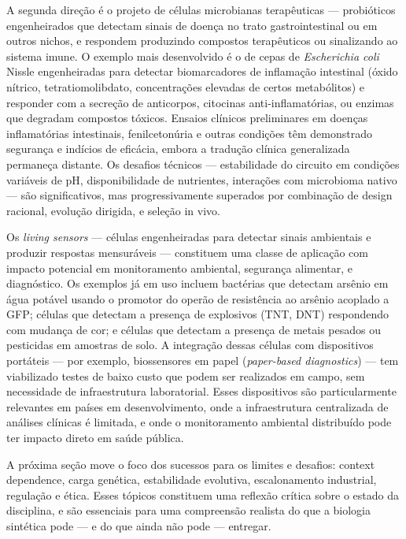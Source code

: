 A segunda direção é o projeto de células microbianas terapêuticas --- probióticos engenheirados que detectam sinais de doença no trato gastrointestinal ou em outros nichos, e respondem produzindo compostos terapêuticos ou sinalizando ao sistema imune. O exemplo mais desenvolvido é o de cepas de \textit{Escherichia coli} Nissle engenheiradas para detectar biomarcadores de inflamação intestinal (óxido nítrico, tetratiomolibdato, concentrações elevadas de certos metabólitos) e responder com a secreção de anticorpos, citocinas anti-inflamatórias, ou enzimas que degradam compostos tóxicos. Ensaios clínicos preliminares em doenças inflamatórias intestinais, fenilcetonúria e outras condições têm demonstrado segurança e indícios de eficácia, embora a tradução clínica generalizada permaneça distante. Os desafios técnicos --- estabilidade do circuito em condições variáveis de pH, disponibilidade de nutrientes, interações com microbioma nativo --- são significativos, mas progressivamente superados por combinação de design racional, evolução dirigida, e seleção in vivo.

Os \emph{living sensors} --- células engenheiradas para detectar sinais ambientais e produzir respostas mensuráveis --- constituem uma classe de aplicação com impacto potencial em monitoramento ambiental, segurança alimentar, e diagnóstico. Os exemplos já em uso incluem bactérias que detectam arsênio em água potável usando o promotor do operão de resistência ao arsênio acoplado a GFP; células que detectam a presença de explosivos (TNT, DNT) respondendo com mudança de cor; e células que detectam a presença de metais pesados ou pesticidas em amostras de solo. A integração dessas células com dispositivos portáteis --- por exemplo, biossensores em papel (\emph{paper-based diagnostics}) --- tem viabilizado testes de baixo custo que podem ser realizados em campo, sem necessidade de infraestrutura laboratorial. Esses dispositivos são particularmente relevantes em países em desenvolvimento, onde a infraestrutura centralizada de análises clínicas é limitada, e onde o monitoramento ambiental distribuído pode ter impacto direto em saúde pública.

A próxima seção move o foco dos sucessos para os limites e desafios: context dependence, carga genética, estabilidade evolutiva, escalonamento industrial, regulação e ética. Esses tópicos constituem uma reflexão crítica sobre o estado da disciplina, e são essenciais para uma compreensão realista do que a biologia sintética pode --- e do que ainda não pode --- entregar.



